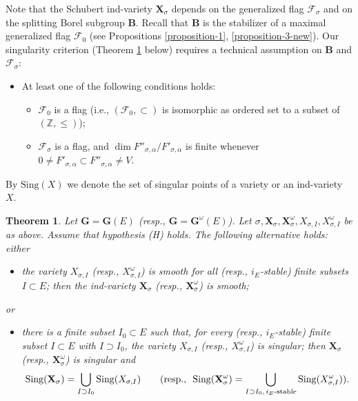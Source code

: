 \documentclass[12pt]{amsart}
\newtheorem{theorem}{Theorem}
\theoremstyle{definition}
\begin{document}
Note that the Schubert ind-variety $\mathbf{X}_\sigma$ depends on the generalized flag $\mathcal{F}_\sigma$ and on the splitting Borel subgroup $\mathbf{B}$. Recall that $\mathbf{B}$ is the stabilizer of a maximal generalized flag  $\mathcal{F}_0$ (see Propositions \ref{proposition-1}, \ref{proposition-3-new}). 
Our singularity criterion (Theorem \ref{theorem-4} below) requires a technical assumption on $\mathbf{B}$ and $\mathcal{F}_\sigma$:
\begin{itemize}
\item[{\rm (H)}] At least one of the following conditions holds:
\begin{itemize}
\item[\rm (i)] $\mathcal{F}_0$ is a flag (i.e., $(\mathcal{F}_0,\subset)$ is isomorphic as ordered set to a subset of $(\mathbb{Z},\leq)$);
\item[\rm (ii)] $\mathcal{F}_{\sigma}$ is a flag, and $\dim F''_{\sigma,\alpha}/F'_{\sigma,\alpha}$ is finite whenever $0\not=F'_{\sigma,\alpha}\subset F''_{\sigma,\alpha}\not=V$.
\end{itemize}
\end{itemize} 

By $\mathrm{Sing}(X)$ we denote the set of singular points of a variety or an ind-variety $X$.


\begin{theorem}
\label{theorem-4}
Let $\mathbf{G}=\mathbf{G}(E)$ (resp., $\mathbf{G}=\mathbf{G}^\omega(E)$). Let $\sigma,\mathbf{X}_\sigma,\mathbf{X}_\sigma^\omega,X_{\sigma,I},X_{\sigma,I}^\omega$ be as above. Assume that hypothesis {\rm (H)} holds.
The following alternative holds: either
\begin{itemize}
\item[\rm (i)]
the variety $X_{\sigma,I}$ (resp., $X_{\sigma,I}^\omega$) is smooth
for all (resp., $i_E$-stable) finite subsets $I\subset E$; then the ind-variety $\mathbf{X}_\sigma$ (resp., $\mathbf{X}_\sigma^\omega$) is smooth;
\end{itemize}
or
\begin{itemize}
\item[\rm (ii)]
there is a finite subset $I_0\subset E$ such that, for every (resp., $i_E$-stable) finite subset $I\subset E$ with $I\supset I_0$, the variety $X_{\sigma,I}$ (resp., $X_{\sigma,I}^\omega$) is singular; then $\mathbf{X}_\sigma$ (resp., $\mathbf{X}_{\sigma}^\omega$) is singular and
\[\mathrm{Sing}(\mathbf{X}_\sigma)=\bigcup_{I\supset I_0}\mathrm{Sing}(X_{\sigma,I})
\qquad \mbox{(resp., \ $\displaystyle\mathrm{Sing}(\mathbf{X}_\sigma^\omega)=\bigcup_{I\supset I_0,\,\mbox{\scriptsize $i_E$-stable}}\mathrm{Sing}(X_{\sigma,I}^\omega)$).}\]
\end{itemize}
\end{theorem}
\end{document}
